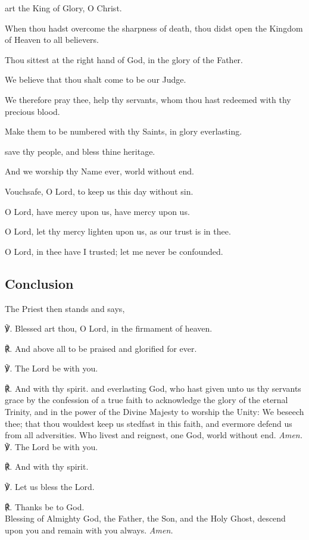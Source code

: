  art the King of Glory, O Christ.\par
{}
    When thou hadst overcome the sharpness of death, thou didst open the Kingdom of Heaven to all believers.\par
    Thou sittest at the right hand of God, in the glory of the Father.\par
    We believe that thou shalt come to be our Judge. 
    \par
    We therefore pray thee, help thy servants, whom thou hast redeemed with thy precious blood.\par
    Make them to be numbered with thy Saints, in glory everlasting.\par
    
 save thy people, and bless thine heritage.\par
{}
    And we worship thy Name ever, world without end.\par
    Vouchsafe, O Lord, to keep us this day without sin.\par
    O Lord, have mercy upon us, have mercy upon us.\par
    O Lord, let thy mercy lighten upon us, as our trust is in thee.\par
    O Lord, in thee have I trusted; let me never be confounded.

\clearpage
\subsection{Conclusion}
\begin{rubric}
    The Priest then stands and says,
\end{rubric}
℣. Blessed art thou, O Lord, in the firmament of heaven.

℟. And above all to be praised and glorified for ever.

℣. The Lord be with you.

℟. And with thy spirit.
{}
 and everlasting God, who hast given unto us thy servants grace by the confession of a true faith to acknowledge the glory of the eternal Trinity, and in the power of the Divine Majesty to worship the Unity: We beseech thee; that thou wouldest keep us stedfast in this faith, and evermore defend us from all adversities. Who livest and reignest, one God, world without end. \textit{Amen.}\\

℣. The Lord be with you.

℟. And with thy spirit.

℣. Let us bless the Lord.

℟. Thanks be to God.\\

 Blessing of Almighty God, the Father, {} the Son, and the Holy Ghost, descend upon you and remain with you always. \textit{Amen.}

